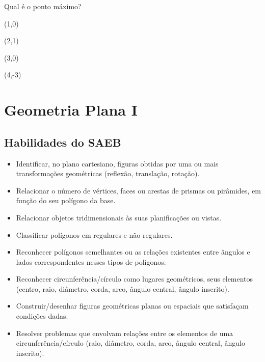 Qual é o ponto máximo?

\begin{escolha}

\item (1,0)

\item (2,1)

\item (3,0)

\item (4,-3)

\end{escolha}

\chapter{Geometria Plana I}

\vspace*{-1.5cm}

\section*{Habilidades do SAEB}

\begin{itemize}
  \item Identificar, no plano cartesiano, figuras obtidas por uma ou mais
transformações geométricas (reflexão, translação, rotação).
  \item Relacionar o número de vértices, faces ou arestas de prismas ou
pirâmides, em função do seu polígono da base.
  \item Relacionar objetos tridimensionais às suas planificações ou vistas.
  \item Classificar polígonos em regulares e não regulares.
  \item Reconhecer polígonos semelhantes ou as relações existentes entre
ângulos e lados correspondentes nesses tipos de polígonos.
  \item Reconhecer circunferência/círculo como lugares geométricos, seus
elementos (centro, raio, diâmetro, corda, arco, ângulo central, ângulo
inscrito).
  \item Construir/desenhar figuras geométricas planas ou espaciais que
satisfaçam condições dadas.
  \item Resolver problemas que envolvam relações entre os elementos de uma
circunferência/círculo (raio, diâmetro, corda, arco, ângulo central, ângulo
inscrito).
\end{itemize} 

